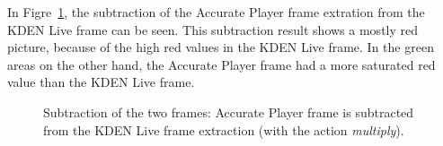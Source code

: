 \documentclass[../MasterThesis.tex]{subfiles}
\begin{document}
In Figre~\ref{figure:multiplygimp}, the subtraction of the Accurate Player frame extration from the KDEN Live frame can be seen. This subtraction result shows a mostly red picture, because of the high red values in the KDEN Live frame. In the green areas on the other hand, the Accurate Player frame had a more saturated red value than the KDEN Live frame.



\begin{figure}[H]
	\begin{center}
		\caption[Subtraction of KDEN Live (\textit{multiply} and Accurate Player).]{Subtraction of the two frames: Accurate Player frame is subtracted from the KDEN Live frame extraction (with the action \textit{multiply}).}
		\label{figure:multiplygimp}
	\end{center}
\end{figure}



	
	
	
	
\end{document}
